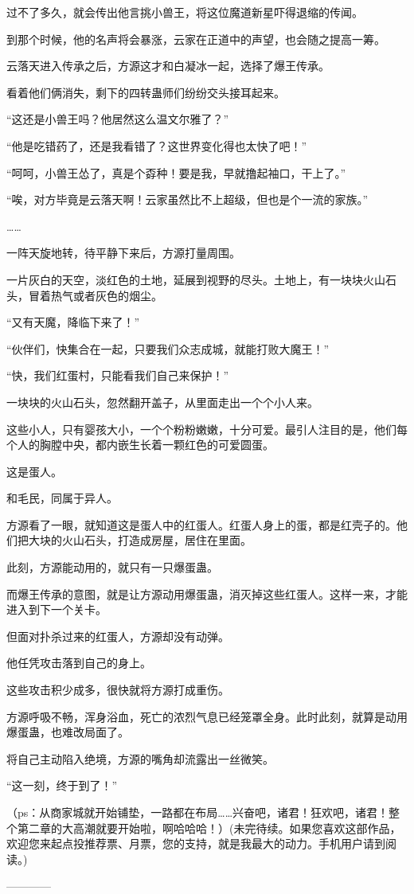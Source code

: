 \begin{this_body}
过不了多久，就会传出他言挑小兽王，将这位魔道新星吓得退缩的传闻。

到那个时候，他的名声将会暴涨，云家在正道中的声望，也会随之提高一筹。

云落天进入传承之后，方源这才和白凝冰一起，选择了爆王传承。

看着他们俩消失，剩下的四转蛊师们纷纷交头接耳起来。

“这还是小兽王吗？他居然这么温文尔雅了？”

“他是吃错药了，还是我看错了？这世界变化得也太快了吧！”

“呵呵，小兽王怂了，真是个孬种！要是我，早就撸起袖口，干上了。”

“唉，对方毕竟是云落天啊！云家虽然比不上超级，但也是个一流的家族。”

……

一阵天旋地转，待平静下来后，方源打量周围。

一片灰白的天空，淡红色的土地，延展到视野的尽头。土地上，有一块块火山石头，冒着热气或者灰色的烟尘。

“又有天魔，降临下来了！”

“伙伴们，快集合在一起，只要我们众志成城，就能打败大魔王！”

“快，我们红蛋村，只能看我们自己来保护！”

一块块的火山石头，忽然翻开盖子，从里面走出一个个小人来。

这些小人，只有婴孩大小，一个个粉粉嫩嫩，十分可爱。最引人注目的是，他们每个人的胸膛中央，都内嵌生长着一颗红色的可爱圆蛋。

这是蛋人。

和毛民，同属于异人。

方源看了一眼，就知道这是蛋人中的红蛋人。红蛋人身上的蛋，都是红壳子的。他们把大块的火山石头，打造成房屋，居住在里面。

此刻，方源能动用的，就只有一只爆蛋蛊。

而爆王传承的意图，就是让方源动用爆蛋蛊，消灭掉这些红蛋人。这样一来，才能进入到下一个关卡。

但面对扑杀过来的红蛋人，方源却没有动弹。

他任凭攻击落到自己的身上。

这些攻击积少成多，很快就将方源打成重伤。

方源呼吸不畅，浑身浴血，死亡的浓烈气息已经笼罩全身。此时此刻，就算是动用爆蛋蛊，也难改局面了。

将自己主动陷入绝境，方源的嘴角却流露出一丝微笑。

“这一刻，终于到了！”

（ps：从商家城就开始铺垫，一路都在布局……兴奋吧，诸君！狂欢吧，诸君！整个第二章的大高潮就要开始啦，啊哈哈哈！）(未完待续。如果您喜欢这部作品，欢迎您来起点投推荐票、月票，您的支持，就是我最大的动力。手机用户请到阅读。)

------------

\end{this_body}

